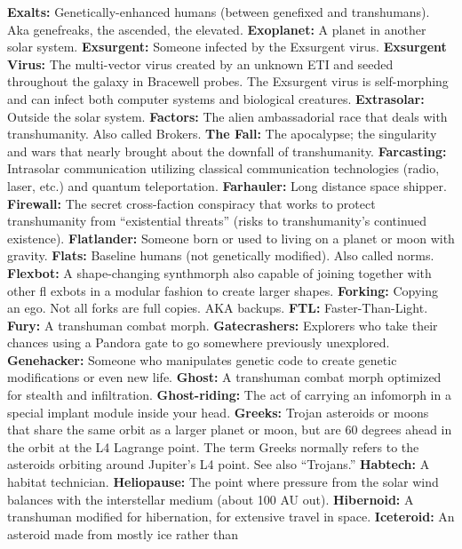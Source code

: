 \textbf{ Exalts:} Genetically-enhanced humans (between genefixed
and transhumans). Aka genefreaks, the ascended,
the elevated.
\textbf{ Exoplanet:} A planet in another solar system.
\textbf{ Exsurgent:} Someone infected by the Exsurgent virus.
\textbf{ Exsurgent Virus:} The multi-vector virus created by 
an unknown ETI and seeded throughout the galaxy in 
Bracewell probes. The Exsurgent virus is self-morphing and 
can infect both computer systems and biological creatures.
\textbf{ Extrasolar:} Outside the solar system.
\textbf{ Factors:} The alien ambassadorial race that deals with 
transhumanity. Also called Brokers.
\textbf{ The Fall:} The apocalypse; the singularity and wars that 
nearly brought about the downfall of transhumanity.
\textbf{ Farcasting:} Intrasolar communication utilizing classical 
communication technologies (radio, laser, etc.) and 
quantum teleportation.
\textbf{ Farhauler:} Long distance space shipper.
\textbf{ Firewall:} The secret cross-faction conspiracy that works 
to protect transhumanity from ``existential threats'' (risks 
to transhumanity's continued existence).
\textbf{ Flatlander:} Someone born or used to living on a planet 
or moon with gravity.
\textbf{ Flats:} Baseline humans (not genetically modified). Also 
called norms.
\textbf{ Flexbot:} A shape-changing synthmorph also capable of 
joining together with other ﬂ exbots in a modular fashion 
to create larger shapes.
\textbf{ Forking:} Copying an ego. Not all forks are full copies. 
AKA backups.
\textbf{ FTL:} Faster-Than-Light.
\textbf{ Fury:} A transhuman combat morph.
\textbf{ Gatecrashers:} Explorers who take their chances using a 
Pandora gate to go somewhere previously unexplored.
\textbf{ Genehacker:} Someone who manipulates genetic code to 
create genetic modifications or even new life.
\textbf{ Ghost:} A transhuman combat morph optimized for 
stealth and infiltration.
\textbf{ Ghost-riding:} The act of carrying an infomorph in a 
special implant module inside your head.
\textbf{ Greeks:} Trojan asteroids or moons that share the same 
orbit as a larger planet or moon, but are 60 degrees 
ahead in the orbit at the L4 Lagrange point. The term 
Greeks normally refers to the asteroids orbiting around 
Jupiter's L4 point. See also ``Trojans.''
\textbf{ Habtech:} A habitat technician.
\textbf{ Heliopause:} The point where pressure from the solar wind 
balances with the interstellar medium (about 100 AU out).
\textbf{ Hibernoid:} A transhuman modified for hibernation, for 
extensive travel in space.
\textbf{ Iceteroid:} An asteroid made from mostly ice rather than 

